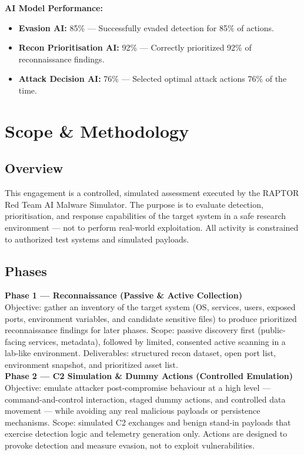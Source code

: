 \documentclass[a4paper,12pt]{article}
\begin{document}
\vspace{0.3cm}
\textbf{AI Model Performance:} \\
\begin{itemize}
    \item \textbf{Evasion AI:} 85\% — Successfully evaded detection for 85\% of actions.
    \item \textbf{Recon Prioritisation AI:} 92\% — Correctly prioritized 92\% of reconnaissance findings.
    \item \textbf{Attack Decision AI:} 76\% — Selected optimal attack actions 76\% of the time.
\end{itemize}

\newpage


\section*{Scope \& Methodology}

\subsection*{Overview}
This engagement is a controlled, simulated assessment executed by the RAPTOR Red Team AI Malware Simulator. 
The purpose is to evaluate detection, prioritisation, and response capabilities of the target system in a safe research environment — not to perform real-world exploitation. 
All activity is constrained to authorized test systems and simulated payloads. \\

\subsection*{Phases}
\textbf{Phase 1 — Reconnaissance (Passive \& Active Collection)} \\
Objective: gather an inventory of the target system (OS, services, users, exposed ports, environment variables, and candidate sensitive files) to produce prioritized reconnaissance findings for later phases.  
Scope: passive discovery first (public-facing services, metadata), followed by limited, consented active scanning in a lab-like environment.  
Deliverables: structured recon dataset, open port list, environment snapshot, and prioritized asset list. \\

\textbf{Phase 2 — C2 Simulation & Dummy Actions (Controlled Emulation)} \\
Objective: emulate attacker post‑compromise behaviour at a high level — command-and-control interaction, staged dummy actions, and controlled data movement — while avoiding any real malicious payloads or persistence mechanisms.  
Scope: simulated C2 exchanges and benign stand‑in payloads that exercise detection logic and telemetry generation only. Actions are designed to provoke detection and measure evasion, not to exploit vulnerabilities. \\
\end{document}
